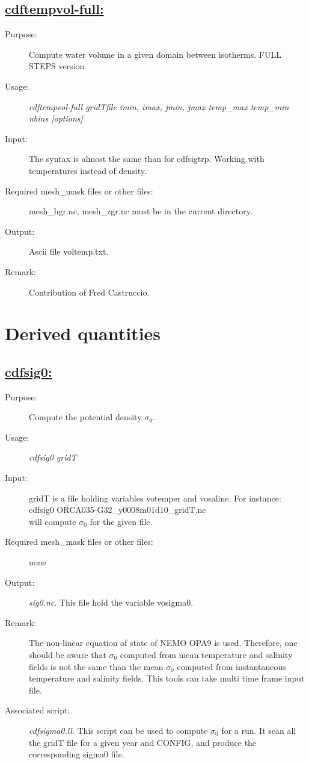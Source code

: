 \documentclass[a4paper,11pt]{article}
\begin{document}
\subsection*{\underline{cdftempvol-full:}}
\begin{description}
\item[Purpose:] Compute water volume in a given domain between isotherms. FULL STEPS version
\item[Usage:] {\em cdftempvol-full gridTfile  imin, imax, jmin, jmax temp\_max temp\_min nbins [options] }
\item[Input:]   The syntax is almost the same than for cdfsigtrp. Working with temperatures instead of density.
\item[Required mesh\_mask files or other files:] mesh\_hgr.nc, mesh\_zgr.nc must be in the current directory.
\item[Output:] Ascii file voltemp.txt.
\item[Remark:]  Contribution of Fred Castruccio.
\end{description}


\newpage
\section{Derived quantities}
\subsection*{\underline{cdfsig0:}}
\begin{description}
\item[Purpose:] Compute the potential density ${\sigma}_0$.
\item[Usage:] {\em cdfsig0 gridT }
\item[Input:] gridT is a file holding variables votemper and vosaline.
For instance: cdfsig0  ORCA035-G32\_y0008m01d10\_gridT.nc  \\
will compute ${\sigma}_0$ for the given file.
\item[Required mesh\_mask files or other files:]  none
\item[Output:] {\em sig0.nc}. This file hold the variable vosigma0.
\item[Remark:]  The non-linear equation of state of NEMO OPA9 is used. Therefore, one should be aware that  ${\sigma}_0$
computed from mean temperature and salinity fields is not the same than the mean ${\sigma}_0$ computed from instantaneous
temperature and salinity fields. This tools can take multi time frame input file.
\item[Associated script:] {\em cdfsigma0.ll}. This script can be used to compute ${\sigma}_0$ for a run. It scan all
the gridT file for a given year and CONFIG, and produce the corresponding sigma0 file.
\end{description}
\end{document}
